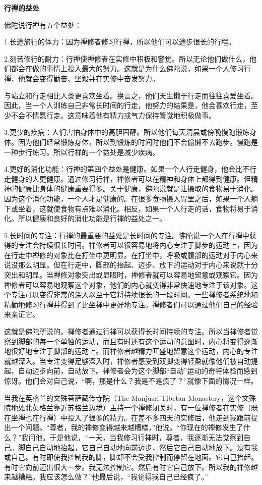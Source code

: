 {\medbreak\bf 行禅的益处\smallbreak}

佛陀说行禅有五个益处：

1.长途旅行的体力：因为禅修者修习行禅，所以他们可以途步很长的行程。

2.刻苦修行的耐力：行禅使禅修者在实修中积极和警觉。所以无论他们做什么，他们都会在做的事情上投入最大的努力。这就是为什么佛陀说，如果一个人修习行禅，他就会变得勤奋、坚毅并在实修中奋发努力。

与站立和行走相比人类更喜欢坐着。换言之，他们天生懒于行走而往往喜爱坐着。因此，当一个人训练自己非常长时间的行走，他努力的结果是，他会喜欢行走，至少不会不情愿行走。这意味着他有精力或气力保持警觉地积极做事。

3.更少的疾病：人们害怕身体中的高胆固醇。所以他们每天清晨或傍晚慢跑锻炼身体。因为他们经常锻炼身体，所以到锻炼的时间时他们不会偷懒不去跑步。\1慢跑是一种步行练习。所以行禅的一个益处是减少疾病。

4.更好的消化功能：行禅的第四个益处是健康。如果一个人行走健身，他会比不行走健身的人更健康。通过修习行禅，禅修者可以在精神和身体上都得到健康。但精神的健康比身体的健康重要得多。关于健康，佛陀说就是让摄取的食物易于消化。因为这个消化功能，一个人才是健康的。在很多食物摄入胃里之后，如果一个人躺下或坐着，这就使食物有点难以消化。相反，如果一个人行走的话，食物将易于消化。所以健康和良好的消化功能是行禅的益处之一。

5.长时间的专注：行禅的最重要的益处是长时间的专注。佛陀说一个人在行禅中获得的专注会持续很长时间。禅修者可以很容易地将内心专注于脚步的运动上，因为在行走中禅修的对象比在打坐中更明显。在打坐中，呼吸或腹部的运动对于内心来说没那么明显。但在行走中，脚部的抬起、迈步、放下的运动对于内心来说就十分突出和明显。当禅修对象突出或显眼时，禅修者就可以容易地留意或观察它。因为禅修者可以容易地观察这个对象，他们的内心就变得非常快速地专注于该对象。这个专注可以变得非常的深入以至于它将持续很长的一段时间。一些禅修者系统地和精勤地修习行禅并得到了比坐禅中更好地专注。禅修者们可以\1通过他们自己的经验来亲证它。

这就是佛陀所说的。禅修者通过行禅可以获得长时间持续的专注。所以当禅修者觉察到脚部的每一个单独的运动，而且有时还有这个运动的意图时，内心将变得逐渐地很好地专注于脚部的运动上。而禅修者越精力旺盛地留意这个运动，内心的专注就越深入。当专注变得足够深入时，禅修者感受到双脚变得轻盈就像他们被自动提起，自动迈步向前，自动放下。禅修者会为这个脚部“自动”运动的奇特体验而感到惊讶。他们会对自己说，“啊，那是什么？我是不是疯了？”就像下面的情况一样。

当我在英格兰的文殊菩萨藏传寺院（The Manjusri Tibetan Monastery，这个文殊院地处北英格兰靠近苏格兰边境）主持一个禅修闭关时，有一位禅修者在实修（既在坐禅也在行禅）中投入了很多的精力。在差不多四天的实修后，他走到我跟前提出一个问题。“尊者，我的禅修变得越来越糟糕，”他说。“你现在的禅修发生了什么？”我问他。于是他说，“一天，当我修习行禅时，尊者，我逐渐无法觉察到自己。脚自己自动地抬起，它自己自动地向前迈步，然后它自己自动地放下。没有我或自己。有时即使我控制我的脚，脚却不会受我控制而停留在地面。它自己抬起。有时它向前迈出很大一步。我无法控制它。然后有时它自己放下。所以我的禅修越来越\1糟糕。我应该怎么做？”他最后说，“我觉得我自己已经疯了。”

